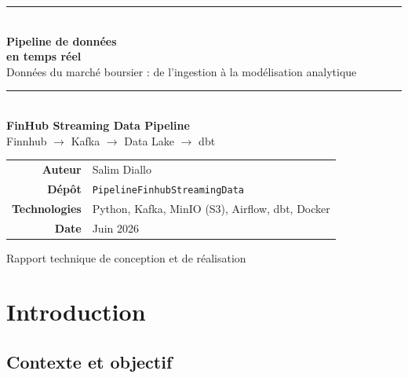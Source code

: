 \documentclass[11pt,a4paper]{article}
\newcommand{\code}[1]{\texttt{\small #1}}
\begin{document}

\begin{titlepage}
\centering
\vspace*{3cm}

{\color{gris}\rule{\linewidth}{0.4pt}}\\[0.6cm]
{\Huge\bfseries\color{grisfonce} Pipeline de données\\[0.2cm] en temps réel}\\[0.5cm]
{\large\color{gris} Données du marché boursier : de l'ingestion à la modélisation analytique}\\[0.4cm]
{\color{gris}\rule{\linewidth}{0.4pt}}\\[1.5cm]

{\large\textbf{FinHub Streaming Data Pipeline}}\\[0.3cm]
{\normalsize\color{gris} Finnhub $\rightarrow$ Kafka $\rightarrow$ Data Lake $\rightarrow$ dbt}\\[3cm]

\begin{tabular}{rl}
\textbf{Auteur} & Salim Diallo \\[4pt]
\textbf{Dépôt} & \code{PipelineFinhubStreamingData} \\[4pt]
\textbf{Technologies} & Python, Kafka, MinIO (S3), Airflow, dbt, Docker \\[4pt]
\textbf{Date} & Juin 2026 \\
\end{tabular}

\vfill
{\small\color{gris} Rapport technique de conception et de réalisation}
\end{titlepage}

\tableofcontents
\newpage

\section{Introduction}

\subsection{Contexte et objectif}
\end{document}
